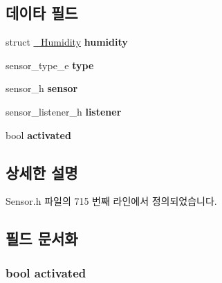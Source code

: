 \subsection*{데이타 필드}
\begin{DoxyCompactItemize}
\item 
\hypertarget{struct__HumidityExtend_aeae7c9d5a8189e24f5e832b83559896f}{struct \hyperlink{struct__Humidity}{\-\_\-\-Humidity} {\bfseries humidity}}\label{struct__HumidityExtend_aeae7c9d5a8189e24f5e832b83559896f}

\item 
\hypertarget{struct__HumidityExtend_abffb09766da2fc510a79bb51f82a36e1}{sensor\-\_\-type\-\_\-e {\bfseries type}}\label{struct__HumidityExtend_abffb09766da2fc510a79bb51f82a36e1}

\item 
\hypertarget{struct__HumidityExtend_a5bae9b7801bc3808411925cde81d3f26}{sensor\-\_\-h {\bfseries sensor}}\label{struct__HumidityExtend_a5bae9b7801bc3808411925cde81d3f26}

\item 
\hypertarget{struct__HumidityExtend_aa977dfb866b24fd7d9a20a9a01b2fd1f}{sensor\-\_\-listener\-\_\-h {\bfseries listener}}\label{struct__HumidityExtend_aa977dfb866b24fd7d9a20a9a01b2fd1f}

\item 
\hypertarget{struct__HumidityExtend_a73e9fa0c3543560192f38a8ab6a78c47}{bool {\bfseries activated}}\label{struct__HumidityExtend_a73e9fa0c3543560192f38a8ab6a78c47}

\end{DoxyCompactItemize}


\subsection{상세한 설명}


Sensor.\-h 파일의 715 번째 라인에서 정의되었습니다.



\subsection{필드 문서화}
\hypertarget{struct__HumidityExtend_a73e9fa0c3543560192f38a8ab6a78c47}{
\subsubsection[{activated}]{\setlength{\rightskip}{0pt plus 5cm}bool activated}}\label{struct__HumidityExtend_a73e9fa0c3543560192f38a8ab6a78c47}



